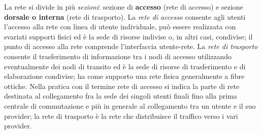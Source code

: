 La rete si divide in più \textit{sezioni}: sezione di \textbf{accesso} (rete di accesso) e sezione \textbf{dorsale o interna} (rete di trasporto). La \textit{rete di accesso} consente agli utenti l'accesso alla rete con linea di utente individuale, può essere realizzata con svariati supporti fisici ed è la sede di risorse indivise o, in altri casi, condivise; il punto di accesso alla rete comprende l'interfaccia utente-rete. La \textit{rete di trasporto} consente il trasferimento di informazione tra i nodi di accesso utilizzando eventualmente dei nodi di transito ed è la sede di risorse di trasferimento e di elaborazione condivise; ha come supporto una rete fisica generalmente a fibre ottiche. Nella pratica con il termine rete di accesso si indica la parte di rete destinata al collegamento fra la sede dei singoli utenti finali fino alla prima centrale di commutazione e più in generale al collegamento tra un utente e il suo provider; la rete di trasporto è la rete che distribuisce il traffico verso i vari provider.

